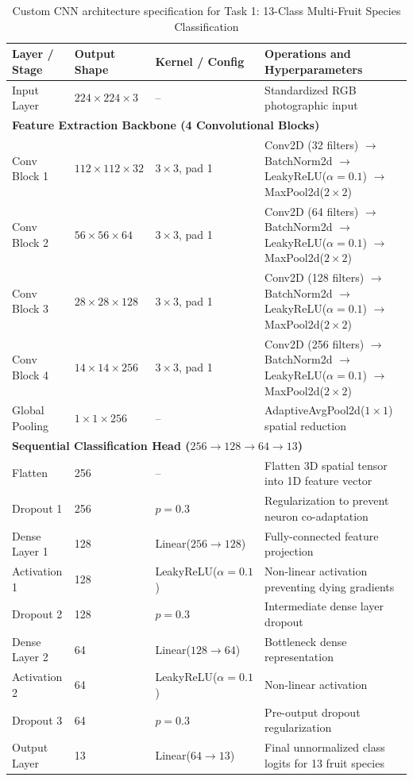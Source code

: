 \documentclass[11pt,a4paper]{article}
\begin{document}
\begin{table}[H]
\centering\small
\begin{tabularx}{\textwidth}{|l|l|l|X|}
\hline
\textbf{Layer / Stage} & \textbf{Output Shape} & \textbf{Kernel / Config} & \textbf{Operations and Hyperparameters} \\
\hline
Input Layer & $224 \times 224 \times 3$ & -- & Standardized RGB photographic input \\
\hline
\multicolumn{4}{|l|}{\textbf{Feature Extraction Backbone (4 Convolutional Blocks)}} \\
\hline
Conv Block 1 & $112 \times 112 \times 32$ & $3 \times 3$, pad 1 & Conv2D (32 filters) $\to$ BatchNorm2d $\to$ LeakyReLU($\alpha=0.1$) $\to$ MaxPool2d($2\times2$) \\ \hline
Conv Block 2 & $56 \times 56 \times 64$ & $3 \times 3$, pad 1 & Conv2D (64 filters) $\to$ BatchNorm2d $\to$ LeakyReLU($\alpha=0.1$) $\to$ MaxPool2d($2\times2$) \\ \hline
Conv Block 3 & $28 \times 28 \times 128$ & $3 \times 3$, pad 1 & Conv2D (128 filters) $\to$ BatchNorm2d $\to$ LeakyReLU($\alpha=0.1$) $\to$ MaxPool2d($2\times2$) \\ \hline
Conv Block 4 & $14 \times 14 \times 256$ & $3 \times 3$, pad 1 & Conv2D (256 filters) $\to$ BatchNorm2d $\to$ LeakyReLU($\alpha=0.1$) $\to$ MaxPool2d($2\times2$) \\ \hline
Global Pooling & $1 \times 1 \times 256$ & -- & AdaptiveAvgPool2d($1 \times 1$) spatial reduction \\ \hline
\multicolumn{4}{|l|}{\textbf{Sequential Classification Head ($256 \to 128 \to 64 \to 13$)}} \\
\hline
Flatten & 256 & -- & Flatten 3D spatial tensor into 1D feature vector \\ \hline
Dropout 1 & 256 & $p = 0.3$ & Regularization to prevent neuron co-adaptation \\ \hline
Dense Layer 1 & 128 & Linear($256 \to 128$) & Fully-connected feature projection \\ \hline
Activation 1 & 128 & LeakyReLU($\alpha=0.1$) & Non-linear activation preventing dying gradients \\ \hline
Dropout 2 & 128 & $p = 0.3$ & Intermediate dense layer dropout \\ \hline
Dense Layer 2 & 64 & Linear($128 \to 64$) & Bottleneck dense representation \\ \hline
Activation 2 & 64 & LeakyReLU($\alpha=0.1$) & Non-linear activation \\ \hline
Dropout 3 & 64 & $p = 0.3$ & Pre-output dropout regularization \\ \hline
Output Layer & 13 & Linear($64 \to 13$) & Final unnormalized class logits for 13 fruit species \\ \hline
\end{tabularx}
\caption{Custom CNN architecture specification for Task 1: 13-Class Multi-Fruit Species Classification}
\label{tab:custom-cnn-13class}
\end{table}
\end{document}
